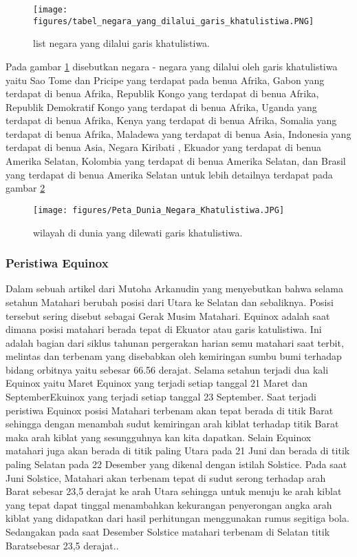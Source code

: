 \begin{figure}[ht]
\centerline{\texttt{[image: figures/tabel\_negara\_yang\_dilalui\_garis\_khatulistiwa.PNG]}}
\caption{list negara yang dilalui garis khatulistiwa.}
\label{tabel_negara_yang_dilalui_garis_khatulistiwa}
\end{figure}

	Pada gambar \ref{tabel_negara_yang_dilalui_garis_khatulistiwa} disebutkan negara - negara yang dilalui oleh garis khatulistiwa yaitu Sao Tome dan Pricipe yang terdapat pada benua Afrika, Gabon yang terdapat di benua Afrika, Republik Kongo yang terdapat di benua Afrika, Republik Demokratif Kongo yang terdapat di benua Afrika, Uganda yang terdapat di benua Afrika, Kenya yang terdapat di benua Afrika, Somalia yang terdapat di benua Afrika, Maladewa yang terdapat di benua Asia, Indonesia yang terdapat di benua Asia, Negara Kiribati , Ekuador yang terdapat di benua Amerika Selatan, Kolombia 
yang terdapat di benua Amerika Selatan, dan Brasil yang terdapat di benua Amerika Selatan untuk lebih detailnya terdapat pada gambar \ref{Peta_Dunia_Negara_Khatulistiwa}
	
\begin{figure}[ht]
\centerline{\texttt{[image: figures/Peta\_Dunia\_Negara\_Khatulistiwa.JPG]}}
\caption{wilayah di dunia yang dilewati garis khatulistiwa.}
\label{Peta_Dunia_Negara_Khatulistiwa}
\end{figure}

\subsubsection{Peristiwa Equinox}
Dalam sebuah artikel dari Mutoha Arkanudin yang menyebutkan bahwa selama setahun Matahari berubah posisi dari Utara ke Selatan dan sebaliknya. Posisi tersebut sering disebut sebagai Gerak Musim Matahari. Equinox adalah saat dimana posisi matahari berada tepat di Ekuator atau garis katulistiwa. 
Ini adalah bagian dari siklus tahunan pergerakan harian semu matahari saat terbit, melintas dan terbenam yang disebabkan oleh kemiringan sumbu bumi
terhadap bidang orbitnya yaitu sebesar 66.56 derajat. Selama setahun terjadi dua kali Equinox yaitu Maret Equinox yang terjadi setiap tanggal 21 Maret dan SeptemberEkuinox yang terjadi setiap tanggal 23 September. 
	Saat terjadi peristiwa Equinox posisi Matahari terbenam akan tepat berada di titik Barat sehingga dengan menambah sudut kemiringan arah kiblat terhadap titik Barat maka arah kiblat yang sesungguhnya kan kita dapatkan. 
	Selain Equinox matahari juga akan berada di titik paling Utara pada 21 Juni dan berada di titik paling Selatan pada 22 Desember yang dikenal dengan istilah Solstice. Pada saat Juni Solstice, Matahari akan terbenam tepat di sudut serong terhadap arah Barat sebesar 23,5 derajat ke arah Utara sehingga untuk menuju ke arah kiblat yang tepat dapat tinggal menambahkan kekurangan penyerongan angka arah kiblat yang didapatkan dari hasil perhitungan menggunakan rumus segitiga bola. Sedangakan pada saat Desember Solstice matahari terbenam di Selatan titik Baratsebesar 23,5 derajat.\cite{arkanudin2008teknik}.


